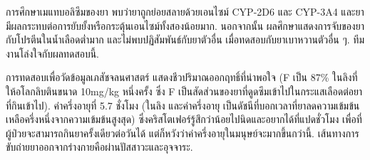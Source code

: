 {\begin{shaded}
%
%
%

การศึกษาเมแทบอลิซึมของยา 
พบว่ายาถูกย่อยสลายด้วยเอนไซม์ CYP-2D6 และ CYP-3A4
และยามีผลกระทบต่อการยับยั้งหรือกระตุ้นเอนไซม์ทั้งสองน้อยมาก.
นอกจากนั้น ผลศึกษาแสดงการจับของยากับโปรตีนในน้ำเลือดต่ำมาก
และไม่พบปฏิสัมพันธ์กับยาตัวอื่น เมื่อทดสอบกับยาเบาหวานตัวอื่น ๆ.
ทีมงานโล่งใจกับผลทดสอบนี้.

%

การทดสอบเพื่อวัดข้อมูลเภสัชจลนศาสตร์
แสดงชีวปริมาณออกฤทธิ์ที่น่าพอใจ (F เป็น 87\% ในลิงที่ให้อโลกลิบตินขนาด 10mg/kg หนึ่งครั้ง 
ซึ่ง F เป็นสัดส่วนของยาที่ดูดซึมเข้าไปในกระแสเลือดต่อยาที่กินเข้าไป).
ค่าครึ่งอายุที่ 5.7 ชั่งโมง (ในลิง และค่าครึ่งอายุ เป็นดัชนีที่บอกเวลาที่ยาลดความเข้มข้นเหลือครึ่งหนึ่งจากความเข้มข้นสูงสุด)
ซึ่งคริสโตเฟอร์รู้สึกว่าน้อยไปนิดและอยากได้ที่แปดชั่วโมง 
เพื่อที่ผู้ป่วยจะสามารถกินยาครั้งเดียวต่อวันได้ แต่ก็หวังว่าค่าครึ่งอายุในมนุษย์จะมากขึ้นกว่านี้.
เส้นทางการขับถ่ายยาออกจากร่างกายคือผ่านปัสสาวะและอุจจาระ.






\end{shaded}}
